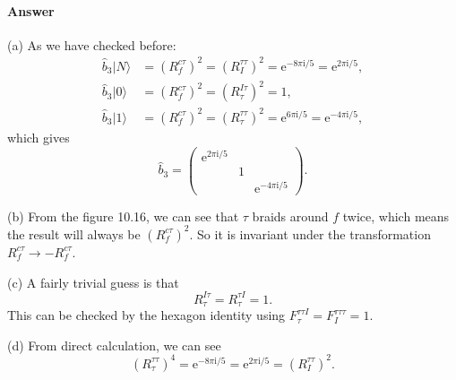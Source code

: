 \documentclass{book}
\begin{document}
\paragraph{Answer}
(a) As we have checked before:
\begin{equation*}
\begin{aligned}
\hat{b}_{3} |N\rangle  & =(R_{f}^{c\tau } )^{2} =(R_{I}^{\tau \tau } )^{2} =\mathrm{e}^{-8\pi \mathrm{i} /5} =\mathrm{e}^{2\pi \mathrm{i} /5} ,\\
\hat{b}_{3} |0\rangle  & =(R_{f}^{c\tau } )^{2} =(R_{\tau }^{I\tau } )^{2} =1,\\
\hat{b}_{3} |1\rangle  & =(R_{f}^{c\tau } )^{2} =(R_{\tau }^{\tau \tau } )^{2} =\mathrm{e}^{6\pi \mathrm{i} /5} =\mathrm{e}^{-4\pi \mathrm{i} /5} ,
\end{aligned}
\end{equation*}
which gives
\begin{equation*}
\hat{b}_{3} =\begin{pmatrix}
\mathrm{e}^{2\pi \mathrm{i} /5} &  & \\
 & 1 & \\
 &  & \mathrm{e}^{-4\pi \mathrm{i} /5}
\end{pmatrix} .
\end{equation*}


(b) From the figure 10.16, we can see that $\tau $ braids around $f$ twice, which means the result will always be $(R_{f}^{c\tau } )^{2}$. So it is invariant under the transformation $R_{f}^{c\tau }\rightarrow -R_{f}^{c\tau }$. 



(c) A fairly trivial guess is that
\begin{equation*}
R_{\tau }^{I\tau } =R_{\tau }^{\tau I} =1.
\end{equation*}
This can be checked by the hexagon identity using $F_{\tau }^{\tau \tau I} =F_{I}^{\tau \tau \tau } =1$. 



(d) From direct calculation, we can see
\begin{equation*}
(R_{\tau }^{\tau \tau } )^{4} =\mathrm{e}^{-8\pi \mathrm{i} /5} =\mathrm{e}^{2\pi \mathrm{i} /5} =(R_{I}^{\tau \tau } )^{2} .
\end{equation*}
\end{document}
